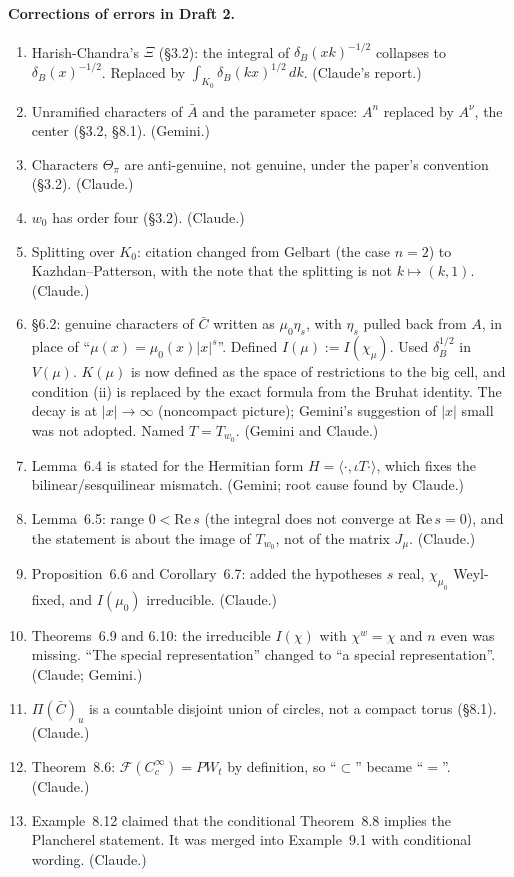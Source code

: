 \documentclass[12pt,letterpaper]{article}
\begin{document}
\paragraph{Corrections of errors in Draft 2.}
\begin{enumerate}[leftmargin=*,itemsep=2pt]
\item Harish-Chandra's $\Xi$ (\S3.2): the integral of $\delta_B(xk)^{-1/2}$ collapses to
$\delta_B(x)^{-1/2}$.  Replaced by $\int_{K_0}\delta_B(kx)^{1/2}\,dk$.  (Claude's report.)
\item Unramified characters of $\bar A$ and the parameter space: $A^n$ replaced by $A^\nu$, the
center (\S3.2, \S8.1).  (Gemini.)
\item Characters $\Theta_\pi$ are anti-genuine, not genuine, under the paper's convention (\S3.2).  (Claude.)
\item $w_0$ has order four (\S3.2).  (Claude.)
\item Splitting over $K_0$: citation changed from Gelbart (the case $n=2$) to Kazhdan--Patterson,
with the note that the splitting is not $k\mapsto(k,1)$.  (Claude.)
\item \S6.2: genuine characters of $\bar C$ written as $\mu_0\eta_s$, with $\eta_s$ pulled back from $A$,
in place of ``$\mu(x)=\mu_0(x)|x|^s$''.  Defined $I(\mu):=I(\chi_\mu)$.  Used $\delta_B^{1/2}$ in $V(\mu)$.
$K(\mu)$ is now defined as the space of restrictions to the big cell, and condition (ii) is
replaced by the exact formula from the Bruhat identity.  The decay is at $|x|\to\infty$ (noncompact
picture); Gemini's suggestion of $|x|$ small was not adopted.  Named $T=T_{w_0}$.  (Gemini and Claude.)
\item Lemma~6.4 is stated for the Hermitian form $H=\langle\cdot,\iota T\cdot\rangle$, which fixes the
bilinear/sesquilinear mismatch.  (Gemini; root cause found by Claude.)
\item Lemma~6.5: range $0<\mathrm{Re}\,s$ (the integral does not converge at $\mathrm{Re}\,s=0$), and
the statement is about the image of $T_{w_0}$, not of the matrix $J_\mu$.  (Claude.)
\item Proposition~6.6 and Corollary~6.7: added the hypotheses $s$ real, $\chi_{\mu_0}$ Weyl-fixed, and
$I(\mu_0)$ irreducible.  (Claude.)
\item Theorems~6.9 and 6.10: the irreducible $I(\chi)$ with $\chi^w=\chi$ and $n$ even was missing.
``The special representation'' changed to ``a special representation''.  (Claude; Gemini.)
\item $\Pi(\bar C)_u$ is a countable disjoint union of circles, not a compact torus (\S8.1).  (Claude.)
\item Theorem~8.6: $\mathcal F(C_c^\infty)=PW_t$ by definition, so ``$\subset$'' became ``$=$''.  (Claude.)
\item Example~8.12 claimed that the conditional Theorem~8.8 implies the Plancherel statement.  It
was merged into Example~9.1 with conditional wording.  (Claude.)
\end{enumerate}
\end{document}
